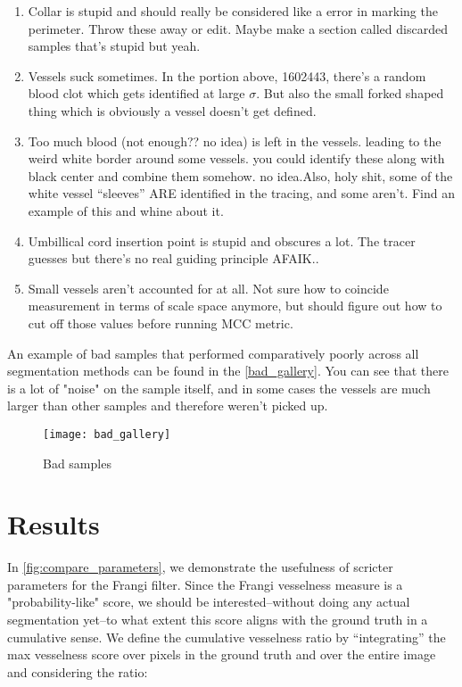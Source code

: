 \begin{enumerate}
\item Collar is stupid and should really be considered like a error in marking the perimeter. Throw these away or edit. Maybe make a section called discarded samples that's stupid but yeah.
\item Vessels suck sometimes. In the portion above, 1602443, there's a random blood clot which gets identified at large $\sigma$. But also the small forked shaped thing which is obviously a vessel doesn't get defined.
\item Too much blood (not enough?? no idea) is left in the vessels. leading to the weird white border around some vessels. you could identify these along with black center and combine them somehow. no idea.Also, holy shit, some of the white vessel ``sleeves'' ARE identified in the tracing, and some aren't. Find an example of this and whine about it.
\item Umbillical cord insertion point is stupid and obscures a lot. The tracer guesses but there's no real guiding principle AFAIK..
\item Small vessels aren't accounted for at all. Not sure how to coincide measurement in terms of scale space anymore, but should figure out how to cut off those values before running MCC metric.
\end{enumerate}

An example of bad samples that performed comparatively poorly across all segmentation methods can be found in the \cref{bad_gallery}. You can see that there is a lot of "noise" on the sample itself, and in some cases the vessels are much larger than other samples and therefore weren't picked up.

\begin{figure}[p]
	\texttt{[image: bad\_gallery]}
	\caption{Bad samples}
	\label{fig:bad-gallery}
\end{figure}

\section{Results}

In \cref{fig:compare_parameters}, we demonstrate the usefulness of scricter parameters for the Frangi filter. Since the Frangi vesselness measure is a "probability-like" score, we should be interested--without doing any actual segmentation yet--to what extent this score aligns with the ground truth in a cumulative sense. We define the cumulative vesselness ratio by ``integrating'' the max vesselness score over pixels in the ground truth and over the entire image and considering the ratio:

